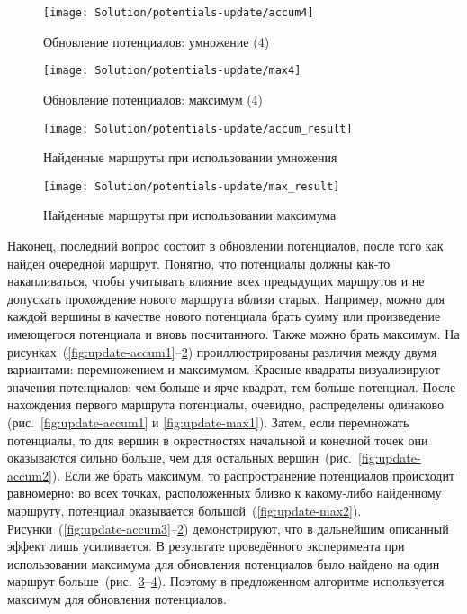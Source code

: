 \begin{figure}
    \texttt{[image: Solution/potentials-update/accum4]}
    \caption{Обновление потенциалов: умножение (4)}
    \label{fig:update-accum4}
\end{figure}

\begin{figure}
    \texttt{[image: Solution/potentials-update/max4]}
    \caption{Обновление потенциалов: максимум (4)}
    \label{fig:update-max4}
\end{figure}

\begin{figure}
    \texttt{[image: Solution/potentials-update/accum\_result]}
    \caption{Найденные маршруты при использовании умножения}
    \label{fig:update-accum-result}
\end{figure}

\begin{figure}
    \texttt{[image: Solution/potentials-update/max\_result]}
    \caption{Найденные маршруты при использовании максимума}
    \label{fig:update-max-result}
\end{figure}

Наконец, последний вопрос состоит в обновлении потенциалов, после того
как найден очередной маршрут. Понятно, что потенциалы должны как-то
накапливаться, чтобы учитывать влияние всех предыдущих маршрутов и не
допускать прохождение нового маршрута вблизи старых. Например, можно
для каждой вершины в качестве нового потенциала брать сумму или
произведение имеющегося потенциала и вновь посчитанного. Также можно
брать максимум. На
рисунках~(\ref{fig:update-accum1}--\ref{fig:update-max4})
проиллюстрированы различия между двумя вариантами: перемножением и
максимумом. Красные квадраты визуализируют значения потенциалов: чем
больше и ярче квадрат, тем больше потенциал. После нахождения первого
маршрута потенциалы, очевидно, распределены одинаково
(рис.~\ref{fig:update-accum1} и \ref{fig:update-max1}). Затем, если
перемножать потенциалы, то для вершин в окрестностях начальной и
конечной точек они оказываются сильно больше, чем для остальных
вершин~(рис.~\ref{fig:update-accum2}). Если же брать максимум, то
распространение потенциалов происходит равномерно: во всех точках,
расположенных близко к какому-либо найденному маршруту, потенциал
оказывается большой~(\ref{fig:update-max2}).
Рисунки~(\ref{fig:update-accum3}--\ref{fig:update-max4})
демонстрируют, что в дальнейшим описанный эффект лишь усиливается. В
результате проведённого эксперимента при использовании максимума для
обновления потенциалов было найдено на один маршрут
больше~(рис.~\ref{fig:update-accum-result}--\ref{fig:update-max-result}).
Поэтому в предложенном алгоритме используется максимум для обновления
потенциалов.

\FloatBarrier

